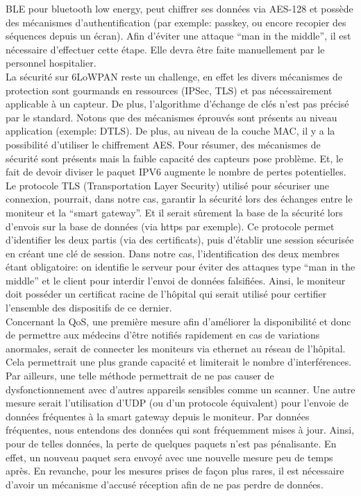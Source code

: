 \documentclass{article}
\begin{document}
BLE pour bluetooth low energy, peut chiffrer ses données via AES-128 et possède des mécanismes d’authentification (par exemple: passkey,  ou encore recopier des séquences depuis un écran). Afin d’éviter une attaque “man in the middle”, il est nécessaire d’effectuer cette étape. Elle devra être faite manuellement par le personnel hospitalier.  
\\

La sécurité sur 6LoWPAN reste un challenge, en effet les divers mécanismes de protection sont gourmands en ressources (IPSec, TLS) et pas nécessairement applicable à un capteur. De plus, l’algorithme d’échange de clés n’est pas précisé par le standard. Notons que des mécanismes éprouvés sont présents au niveau application (exemple: DTLS). De plus, au niveau de la couche MAC, il y a la possibilité d’utiliser le chiffrement AES. Pour résumer, des mécanismes de sécurité sont présents mais la faible capacité des capteurs pose problème. Et, le fait de devoir diviser le paquet IPV6 augmente le nombre de pertes potentielles.
\\

Le protocole TLS (Transportation Layer Security) utilisé pour sécuriser une connexion, pourrait, dans notre cas, garantir la sécurité lors des échanges entre le moniteur et la “smart gateway”.  Et il serait sûrement la base de la sécurité lors d’envois sur la base de données (via https par exemple). Ce protocole permet d’identifier les deux partis (via des certificats), puis d’établir une session sécurisée en créant une clé de session. Dans notre cas, l’identification des deux membres étant obligatoire: on identifie le serveur pour éviter des attaques type “man in the middle” et le client pour interdir l’envoi de données falsifiées. Ainsi, le moniteur doit posséder un certificat racine de l’hôpital qui serait utilisé pour certifier l’ensemble des dispositifs de ce dernier.
\\

Concernant la QoS, une première mesure afin d’améliorer la disponibilité et donc de permettre aux médecins d’être notifiés rapidement en cas de variations anormales, serait de connecter les moniteurs via ethernet au réseau de l’hôpital. Cela permettrait une plus grande capacité et limiterait le nombre d’interférences. Par ailleurs, une telle méthode permettrait de ne pas causer de dysfonctionnement avec d’autres appareils sensibles comme un scanner. Une autre mesure serait l’utilisation d’UDP (ou d’un protocole équivalent) pour l’envoie de données fréquentes à la smart gateway depuis le moniteur. Par données fréquentes, nous entendons des données qui sont fréquemment mises à jour. Ainsi, pour de telles données, la perte de quelques paquets n’est pas pénalisante. En effet, un nouveau paquet sera envoyé avec une nouvelle mesure peu de temps après. En revanche, pour les mesures prises de façon plus rares, il est nécessaire d’avoir un mécanisme d’accusé réception afin de ne pas perdre de données.
\end{document}
